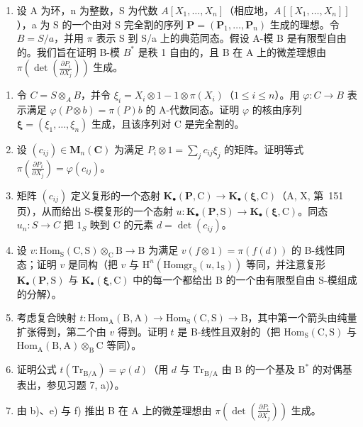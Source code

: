\begin{enumerate}
\def\labelenumi{\arabic{enumi})}
\setcounter{enumi}{8}
\tightlist
\item
  设 A 为环，n 为整数，S 为代数 \(A[X_{1},\ldots,X_{n}]\)（相应地，\(A[[X_{1},\ldots,X_{n}]]\)），a 为 S 的一个由对 S 完全割的序列 \(\mathbf{P}=(\mathbf{P}_{1},\ldots,\mathbf{P}_{n})\) 生成的理想。令 \(B=S/a\)，并用 \(\pi\) 表示 S 到 S/a 上的典范同态。假设 A-模 B 是有限型自由的。我们旨在证明 B-模 \(B^{*}\) 是秩 1 自由的，且 B 在 A 上的微差理想由 \(\pi(\det(\frac{\partial P_{i}}{\partial X_{j}}))\) 生成。
\end{enumerate}

\begin{enumerate}
\def\labelenumi{\alph{enumi})}
\item
  令 \(C = S \otimes_{A} B\)，并令 \(\xi_{i} = X_{i} \otimes 1 - 1 \otimes \pi(X_{i})\)（\(1 \leqslant i \leqslant n\)）。用 \(\varphi : C \to B\) 表示满足 \(\varphi(P \otimes b) = \pi(P)b\) 的 A-代数同态。证明 \(\varphi\) 的核由序列 \(\boldsymbol{\xi} = (\xi_{1}, \ldots, \xi_{n})\) 生成，且该序列对 C 是完全割的。
\item
  设 \((c_{ij}) \in \mathbf{M}_{n}(\mathbf{C})\) 为满足 \(P_{i} \otimes 1 = \sum_{j} c_{ij} \xi_{j}\) 的矩阵。证明等式 \(\pi(\frac{\partial P_{i}}{\partial X_{j}}) = \varphi(c_{ij})\)。
\item
  矩阵 \((c_{ij})\) 定义复形的一个态射 \(\mathbf{K}_{\bullet}(\mathbf{P},\mathrm{C})\to\mathbf{K}_{\bullet}(\boldsymbol{\xi},\mathrm{C})\)（A, X, 第~151 页），从而给出 S-模复形的一个态射 \(u:\mathbf{K}_{\bullet}(\mathbf{P},\mathrm{S})\to\mathbf{K}_{\bullet}(\boldsymbol{\xi},\mathrm{C})\)。同态 \(u_{n}:S\to C\) 把 \(1_{S}\) 映到 C 的元素 \(d=\det(c_{ij})\)。
\item
  设 \(v: \mathrm{Hom}_{\mathrm{S}}(\mathrm{C}, \mathrm{S}) \otimes_{\mathrm{C}} \mathrm{B} \to \mathrm{B}\) 为满足 \(v(f \otimes 1) = \pi(f(d))\) 的 B-线性同态；证明 \(v\) 是同构（把 \(v\) 与 \(\mathrm{H}^n(\mathrm{Homgr}_{\mathrm{S}}(u, 1_{\mathrm{S}}))\) 等同，并注意复形 \(\mathbf{K}_{\bullet}(\mathbf{P}, \mathrm{S})\) 与 \(\mathbf{K}_{\bullet}(\boldsymbol{\xi}, \mathrm{C})\) 中的每一个都给出 B 的一个由有限型自由 S-模组成的分解）。

\item
  考虑复合映射 \(t: \mathrm{Hom}_{\mathrm{A}}(\mathrm{B}, \mathrm{A}) \to \mathrm{Hom}_{\mathrm{S}}(\mathrm{C}, \mathrm{S}) \to \mathrm{B}\)，其中第一个箭头由纯量扩张得到，第二个由 \(v\) 得到。证明 \(t\) 是 B-线性且双射的（把 \(\mathrm{Hom}_{\mathrm{S}}(\mathrm{C}, \mathrm{S})\) 与 \(\mathrm{Hom}_{\mathrm{A}}(\mathrm{B}, \mathrm{A}) \otimes_{\mathrm{B}} \mathrm{C}\) 等同）。
\item
  证明公式 \(t(\mathrm{Tr}_{\mathrm{B / A}}) = \varphi (d)\)（用 \(d\) 与 \(\mathrm{Tr}_{\mathrm{B / A}}\) 由 B 的一个基及 \(\mathrm{B}^*\) 的对偶基表出，参见习题 7, a)）。
\item
  由 b)、e) 与 f) 推出 B 在 A 上的微差理想由 \(\pi(\det(\frac{\partial P_i}{\partial X_j}))\) 生成。
\end{enumerate}

